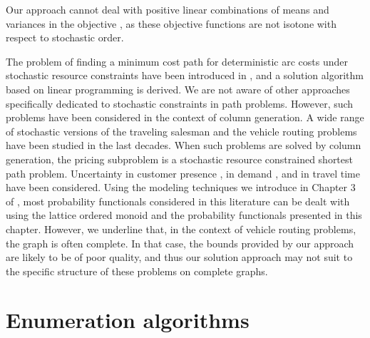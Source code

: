 \documentclass[11pt]{amsart}
\theoremstyle{plain}
\theoremstyle{remark}
\begin{document}
Our approach cannot deal with positive linear combinations of means and variances in the objective \cite{sivakumar1994variance,nikolova2006stochastic,nikolova2010high}, as these objective functions are not isotone with respect to stochastic order.












The problem of finding a minimum cost path for deterministic arc costs under stochastic resource constraints have been introduced in \cite{kosuch2010stochastic}, and a solution algorithm based on linear programming is derived. We are not aware of other approaches specifically dedicated to stochastic constraints in path problems. However, such problems have been considered in the context of column generation. A wide range of stochastic versions of the traveling salesman and the vehicle routing problems have been studied in the last decades. When such problems are solved by column generation, the pricing subproblem is a stochastic resource constrained shortest path problem. Uncertainty in customer presence \cite{jaillet1988priori,jaillet1988probabilistic}, in demand \citep{sungur2008robust,gounaris2013robust,bertsimas1996new,bertsimas1992vehicle}, and in travel time \citep{jaillet2016routing,chang2009stochastic,jula2006truck,li2010vehicle,mazmanyan2009stochastic,russell2008vehicle,tacs2014vehicle,adulyasak2015models} have been considered. Using the modeling techniques we introduce in Chapter 3 of \cite{parmentier2016thesis}, most probability functionals considered in this literature can be dealt with using the lattice ordered monoid and the probability functionals presented in this chapter. However, we underline that, in the context of vehicle routing problems, the graph is often complete. In that case, the bounds provided by our approach are likely to be of poor quality, and thus our solution approach may not suit to the specific structure of these problems on complete graphs.







\section{Enumeration algorithms} \label{sec:enumeration_algorithms}
\end{document}
